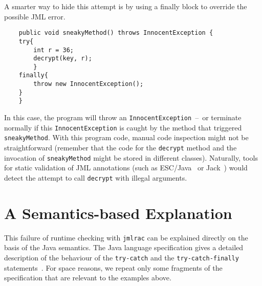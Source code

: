 \documentclass[]{llncs}
\begin{document}
A smarter way to hide this attempt is by using a finally block to
override the possible JML error.
\begin{verbatim}
    public void sneakyMethod() throws InnocentException {
	try{ 
	    int r = 36; 
	    decrypt(key, r);                                           
	    }           
	finally{
	    throw new InnocentException();
	}
    }
\end{verbatim}
In this case, the program will throw an
\texttt{InnocentException}~--~or terminate normally if this
\texttt{InnocentException} is caught by the method that triggered
\texttt{sneakyMethod}. With this program code, manual code inspection
might not be straightforward (remember that the code for the
\texttt{decrypt} method and the invocation of \texttt{sneakyMethod}
might be stored in different classes). Naturally, tools for static
validation of JML annotations (such as ESC/Java~\cite{CokK04} or
Jack~\cite{BartheBCGHLPR07:FMCO}) would detect the attempt to call
\texttt{decrypt} with illegal arguments.

\section{A Semantics-based Explanation}\label{SecExplanation}

This failure of runtime checking with \texttt{jmlrac} can be explained
directly on the basis of the Java semantics. The Java language
specification gives a detailed description of the behaviour of the
\texttt{try-catch} and the 
\texttt{try-catch-finally} statements~\cite[\S
14.20]{GoslingJSB05}. For space reasons, we repeat only some fragments of
the specification that are relevant to the examples above.
\end{document}
